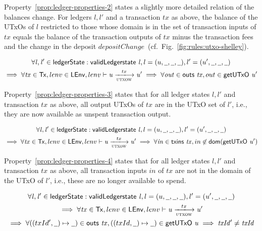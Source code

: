 Property~\ref{prop:ledger-properties-2} states a slightly more detailed relation
of the balances change. For ledgers $l, l'$ and a transaction $tx$ as above, the
balance of the UTxOs of $l$ restricted to those whose domain is in the set of
transaction inputs of $tx$ equals the balance of the transaction outputs of $tx$
minus the transaction fees and the change in the deposit
$depositChange$~(cf.~Fig.~\ref{fig:rules:utxo-shelley}).

\begin{property}
  \begin{multline*}
    \forall \var{l}, \var{l'} \in \ledgerState: \applyFun{validLedgerstate}{l},
    l=(u,\wcard,\wcard,\wcard), l' = (u',\wcard,\wcard,\wcard)\\
    \implies \forall \var{tx} \in \Tx, lenv \in\LEnv, lenv \vdash \var{u}
    \trans{utxow}{tx} \var{u'} \implies \forall \var{out} \in
    \applyFun{outs}{tx}, out \in \applyFun{getUTxO}{u'}
  \end{multline*}
  \label{prop:ledger-properties-3}
\end{property}

Property~\ref{prop:ledger-properties-3} states that for all ledger states
$l, l'$ and transaction $tx$ as above, all output UTxOs of $tx$ are in the UTxO
set of $l'$, i.e., they are now available as unspent transaction output.

\begin{property}
  \begin{multline*}
    \forall \var{l}, \var{l'} \in \ledgerState: \applyFun{validLedgerstate}{l},
    l=(u,\wcard,\wcard,\wcard), l' = (u',\wcard,\wcard,\wcard)\\
    \implies \forall \var{tx} \in \Tx, lenv \in\LEnv, lenv \vdash \var{u}
    \trans{utxow}{tx} \var{u'} \implies \forall \var{in} \in
    \applyFun{txins}{tx}, in \not\in \fun{dom}(\applyFun{getUTxO}{u'})
  \end{multline*}
  \label{prop:ledger-properties-4}
\end{property}

Property~\ref{prop:ledger-properties-4} states that for all ledger states
$l, l'$ and transaction $tx$ as above, all transaction inputs $in$ of $tx$ are
not in the domain of the UTxO of $l'$, i.e., these are no longer available to
spend.

\begin{property}
  \begin{multline*}
    \forall \var{l}, \var{l'} \in \ledgerState: \applyFun{validLedgerstate}{l},
    l=(u,\wcard,\wcard,\wcard), l' = (u',\wcard,\wcard,\wcard)\\
    \implies \forall \var{tx} \in \Tx, lenv \in\LEnv, lenv \vdash \var{u}
    \trans{utxow}{tx} \var{u'} \\ \implies \forall ((txId', \wcard) \mapsto
    \wcard) \in \applyFun{outs}{tx}, ((txId, \wcard) \mapsto \wcard)
    \in\applyFun{getUTxO}{u} \implies \var{txId'} \neq \var{txId}
  \end{multline*}
  \label{prop:ledger-properties-5}
\end{property}

